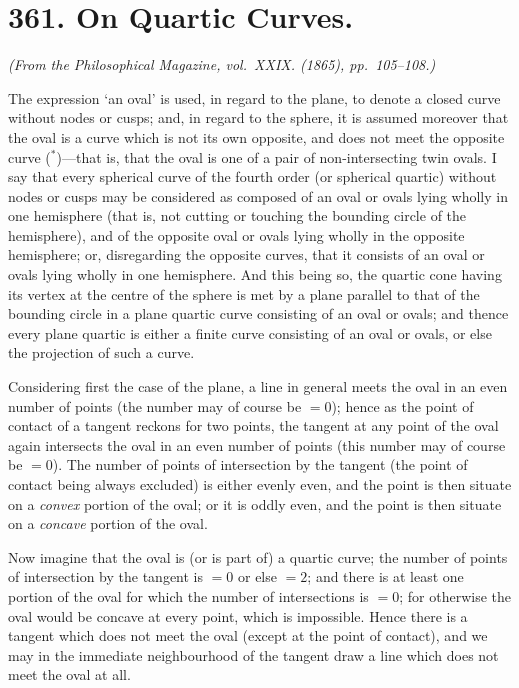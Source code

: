 \documentclass[11pt,a4paper]{article}
\theoremstyle{plain}
\begin{document}
\section*{361. On Quartic Curves.\quad [361]}
\label{sec:361}

\begin{flushright}
\textit{(From the Philosophical Magazine, vol.~XXIX. (1865), pp.~105--108.)}
\end{flushright}

The expression `an oval' is used, in regard to the plane, to denote a closed curve without nodes or cusps; and, in regard to the sphere, it is assumed moreover that the oval is a curve which is not its own opposite, and does not meet the opposite curve ($^*$)---that is, that the oval is one of a pair of non-intersecting twin ovals. I say that every spherical curve of the fourth order (or spherical quartic) without nodes or cusps may be considered as composed of an oval or ovals lying wholly in one hemisphere (that is, not cutting or touching the bounding circle of the hemisphere), and of the opposite oval or ovals lying wholly in the opposite hemisphere; or, disregarding the opposite curves, that it consists of an oval or ovals lying wholly in one hemisphere. And this being so, the quartic cone having its vertex at the centre of the sphere is met by a plane parallel to that of the bounding circle in a plane quartic curve consisting of an oval or ovals; and thence every plane quartic is either a finite curve consisting of an oval or ovals, or else the projection of such a curve.

Considering first the case of the plane, a line in general meets the oval in an even number of points (the number may of course be $= 0$); hence as the point of contact of a tangent reckons for two points, the tangent at any point of the oval again intersects the oval in an even number of points (this number may of course be $= 0$). The number of points of intersection by the tangent (the point of contact being always excluded) is either evenly even, and the point is then situate on a \textit{convex} portion of the oval; or it is oddly even, and the point is then situate on a \textit{concave} portion of the oval.

Now imagine that the oval is (or is part of) a quartic curve; the number of points of intersection by the tangent is $= 0$ or else $= 2$; and there is at least one portion of the oval for which the number of intersections is $= 0$; for otherwise the oval would be concave at every point, which is impossible. Hence there is a tangent which does not meet the oval (except at the point of contact), and we may in the immediate neighbourhood of the tangent draw a line which does not meet the oval at all.
\end{document}
